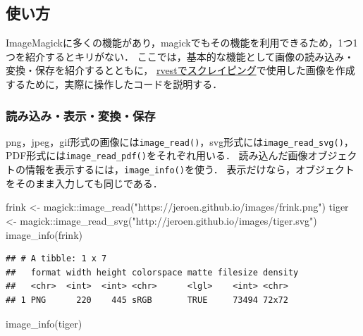 \documentclass[
]{article}
\newenvironment{Shaded}{\begin{snugshade}}{\end{snugshade}}
\newcommand{\FunctionTok}[1]{\textcolor[rgb]{0.00,0.00,0.00}{#1}}
\newcommand{\NormalTok}[1]{#1}
\newcommand{\OtherTok}[1]{\textcolor[rgb]{0.56,0.35,0.01}{#1}}
\newcommand{\SpecialCharTok}[1]{\textcolor[rgb]{0.00,0.00,0.00}{#1}}
\newcommand{\StringTok}[1]{\textcolor[rgb]{0.31,0.60,0.02}{#1}}
\begin{document}
\hypertarget{ux4f7fux3044ux65b9-1}{%
\subsection{使い方}\label{ux4f7fux3044ux65b9-1}}

ImageMagickに多くの機能があり，magickでもその機能を利用できるため，1つ1つを紹介するとキリがない．
ここでは，基本的な機能として画像の読み込み・変換・保存を紹介するとともに，
\protect\hyperlink{rvest}{rvestでスクレイピング}で使用した画像を作成するために，実際に操作したコードを説明する．

\hypertarget{ux8aadux307fux8fbcux307fux8868ux793aux5909ux63dbux4fddux5b58}{%
\subsubsection{読み込み・表示・変換・保存}\label{ux8aadux307fux8fbcux307fux8868ux793aux5909ux63dbux4fddux5b58}}

png，jpeg，gif形式の画像には\texttt{image\_read()}，svg形式には\texttt{image\_read\_svg()}，PDF形式には\texttt{image\_read\_pdf()}をそれぞれ用いる．
読み込んだ画像オブジェクトの情報を表示するには，\texttt{image\_info()}を使う．
表示だけなら，オブジェクトをそのまま入力しても同じである．

\begin{Shaded}
\begin{Highlighting}[]
\NormalTok{frink }\OtherTok{\textless{}{-}}\NormalTok{ magick}\SpecialCharTok{::}\FunctionTok{image\_read}\NormalTok{(}\StringTok{"https://jeroen.github.io/images/frink.png"}\NormalTok{)}
\NormalTok{tiger }\OtherTok{\textless{}{-}}\NormalTok{ magick}\SpecialCharTok{::}\FunctionTok{image\_read\_svg}\NormalTok{(}\StringTok{"http://jeroen.github.io/images/tiger.svg"}\NormalTok{)}
\FunctionTok{image\_info}\NormalTok{(frink)}
\end{Highlighting}
\end{Shaded}

\begin{verbatim}
## # A tibble: 1 x 7
##   format width height colorspace matte filesize density
##   <chr>  <int>  <int> <chr>      <lgl>    <int> <chr>  
## 1 PNG      220    445 sRGB       TRUE     73494 72x72
\end{verbatim}

\begin{Shaded}
\begin{Highlighting}[]
\FunctionTok{image\_info}\NormalTok{(tiger)}
\end{Highlighting}
\end{Shaded}
\end{document}
